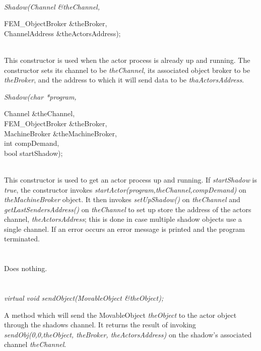   \\
{\em Shadow(Channel \&theChannel, 

\indent\indent\indent\indent FEM\_ObjectBroker \&theBroker, \\
\indent\indent\indent\indent ChannelAddress \&theActorsAddress);}\\
This constructor is used when the actor process is already up and
running. The constructor sets its channel to be {\em theChannel}, its 
associated object broker to be {\em theBroker}, and the address to
which it will send data to be {\em thaActorsAddress}. \\ 

{\em Shadow(char *program, 

\indent\indent\indent\indent Channel \&theChannel, \\
\indent\indent\indent\indent FEM\_ObjectBroker \&theBroker, \\
\indent\indent\indent\indent MachineBroker \&theMachineBroker, \\
\indent\indent\indent\indent int compDemand, \\
\indent\indent\indent\indent bool startShadow);}  \\
This constructor is used to get an actor process up and running. If 
{\em startShadow} is {\em true}, the constructor invokes 
{\em startActor(program,theChannel,compDemand)} on  
{\em theMachineBroker} object. It then invokes {\em setUpShadow()} on
{\em theChannel} and {\em getLastSendersAddress()} on {\em theChannel}
to set up store the address of the actors channel, {\em
theActorsAddress}; this is done in case multiple shadow objects use a
single channel. 
If an error occurs an error message is printed and the program terminated.\\ 

 \\
\\ 
Does nothing. \\

  \\

  \\
{\em virtual void sendObject(MovableObject \&theObject);}

A method which will send the MovableObject {\em theObject} to
the actor object through the shadows channel. It returns the
result of invoking {\em sendObj(0,0,theObject, theBroker, theActorsAddress)} on the
shadow's associated channel {\em theChannel}. \\ 


